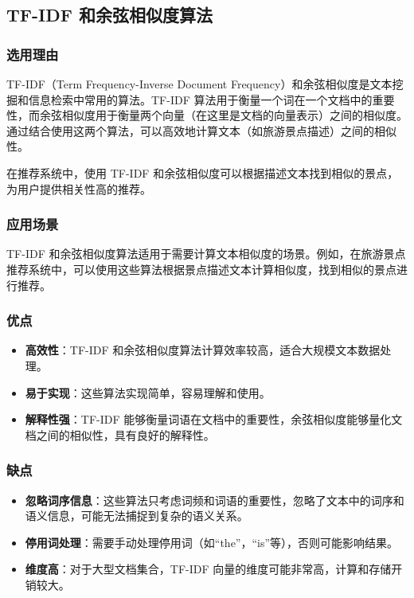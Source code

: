 \documentclass{ctexart}
\begin{document}
\subsection{TF-IDF 和余弦相似度算法}

\subsubsection{选用理由}

TF-IDF（Term Frequency-Inverse Document Frequency）和余弦相似度是文本挖掘和信息检索中常用的算法。TF-IDF 算法用于衡量一个词在一个文档中的重要性，而余弦相似度用于衡量两个向量（在这里是文档的向量表示）之间的相似度。通过结合使用这两个算法，可以高效地计算文本（如旅游景点描述）之间的相似性。

在推荐系统中，使用 TF-IDF 和余弦相似度可以根据描述文本找到相似的景点，为用户提供相关性高的推荐。

\subsubsection{应用场景}

TF-IDF 和余弦相似度算法适用于需要计算文本相似度的场景。例如，在旅游景点推荐系统中，可以使用这些算法根据景点描述文本计算相似度，找到相似的景点进行推荐。

\subsubsection{优点}

\begin{itemize}
    \item \textbf{高效性}：TF-IDF 和余弦相似度算法计算效率较高，适合大规模文本数据处理。
    \item \textbf{易于实现}：这些算法实现简单，容易理解和使用。
    \item \textbf{解释性强}：TF-IDF 能够衡量词语在文档中的重要性，余弦相似度能够量化文档之间的相似性，具有良好的解释性。
\end{itemize}

\subsubsection{缺点}

\begin{itemize}
    \item \textbf{忽略词序信息}：这些算法只考虑词频和词语的重要性，忽略了文本中的词序和语义信息，可能无法捕捉到复杂的语义关系。
    \item \textbf{停用词处理}：需要手动处理停用词（如“the”，“is”等），否则可能影响结果。
    \item \textbf{维度高}：对于大型文档集合，TF-IDF 向量的维度可能非常高，计算和存储开销较大。
\end{itemize}
\end{document}
